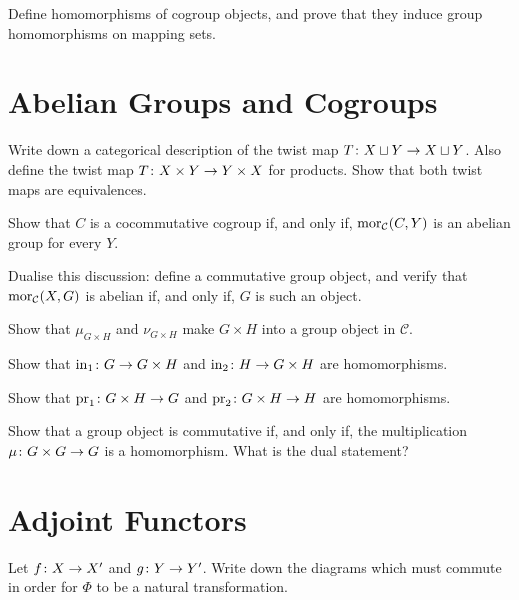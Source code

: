 \bs
\es

\bp
Define homomorphisms of cogroup objects, and prove that they induce group homomorphisms on mapping sets.
\ep

\bs
\es

\section{Abelian Groups and Cogroups}

\bp
Write down a categorical description of the twist map $T\colon X\sqcup Y\to X\sqcup Y$. Also define the twist map $T \colon X \times Y \to Y \times X$ for products. Show that both twist maps are equivalences.
\ep

\bs
\es

\bp
Show that $C$ is a cocommutative cogroup if, and only if, $\operatorname{mor}_{\mathcal{C}}(C,Y)$ is an abelian group for every $Y$.
\ep

\bs
\es

\bp
Dualise this discussion: define a commutative group object, and verify that $\operatorname{mor}_{\mathcal{C}}(X,G)$ is abelian if, and only if, $G$ is such an object.
\ep

\bs
\es

\bp
\ben[label=(\alph*)]
\item Show that $\mu_{G\times H}$ and $\nu_{G\times H}$ make $G \times H$ into a group object in $\mathcal{C}$.
\item Show that $\mathrm{in}_1 \colon G \to G\times H$ and $\mathrm{in}_2 \colon H \to G \times H$ are homomorphisms.
\item Show that $\mathrm{pr}_1 \colon G\times H \to G$ and $\mathrm{pr}_2 \colon G\times H \to H$ are homomorphisms.
\een
\ep

\bs
\ben[label=(\alph*)]
\item
\item
\item
\een
\es

\bp
Show that a group object is commutative if, and only if, the multiplication $\mu\colon G \times G \to G$ is a homomorphism. What is the dual statement?
\ep

\bs
\es

\section{Adjoint Functors}

\bx
Let $f \colon X \to X'$ and $g \colon Y \to Y'$. Write down the diagrams which must commute in order for $\Phi$ to be a natural transformation.
\ex

